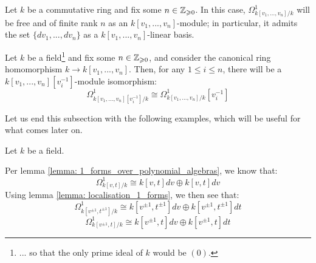         \begin{lemma} \label{lemma: 1_forms_over_polynomial_algebras}
            \cite[\href{https://stacks.math.columbia.edu/tag/00RX}{Tag 00RX}]{stacks} Let $k$ be a commutative ring and fix some $n \in \mathbb{Z}_{\geqslant 0}$. In this case, $\Omega^1_{k[v_1, ..., v_n]/k}$ will be free and of finite rank $n$ as an $k[v_1, ..., v_n]$-module; in particular, it admits the set $\{dv_1, ..., dv_n\}$ as a $k[v_1, ..., v_n]$-linear basis.
        \end{lemma}
        \begin{lemma} \label{lemma: localisation_1_forms}
            \cite[\href{https://stacks.math.columbia.edu/tag/031G}{Tag 031G}]{stacks} Let $k$ be a field\footnote{... so that the only prime ideal of $k$ would be $(0)$.} and fix some $n \in \mathbb{Z}_{\geqslant 0}$, and consider the canonical ring homomorphism $k \to k[v_1, ..., v_n]$. Then, for any $1 \leq i \leq n$, there will be a $k[v_1, ..., v_n][v_i^{-1}]$-module isomorphism:
                $$\Omega^1_{k[v_1, ..., v_n][v_i^{-1}]/k} \cong \Omega^1_{k[v_1, ..., v_n]/k}[v_i^{-1}]$$
        \end{lemma}

        Let us end this subsection with the following examples, which will be useful for what comes later on.
        \begin{example}
            Let $k$ be a field.
        
            Per lemma \ref{lemma: 1_forms_over_polynomial_algebras}, we know that:
                $$\Omega^1_{k[v, t]/k} \cong k[v, t] dv \oplus k[v, t] dv$$
            Using lemma \ref{lemma: localisation_1_forms}, we then see that:
                $$\Omega^1_{k[v^{\pm 1}, t^{\pm 1}]/k} \cong k[v^{\pm 1}, t^{\pm 1}] dv \oplus k[v^{\pm 1}, t^{\pm 1}] dt$$
                $$\Omega^1_{k[v^{\pm 1}, t]/k} \cong k[v^{\pm 1}, t] dv \oplus k[v^{\pm 1}, t] dt$$
        \end{example}

